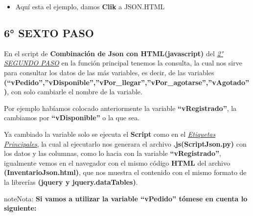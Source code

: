 \documentclass[letterpaper,11pt,spanish]{sphinxmanual}
\begin{document}
\begin{itemize}
\item {} 
Aquí esta el ejemplo, damos \textbf{Clik} a JSON.HTML

\end{itemize}


\subsection{6° SEXTO PASO}
\label{_templates/Contenido6/Parte3:json-html}\label{_templates/Contenido6/Parte3:sexto-paso}
En el script de \textbf{Combinación de Json con HTML(javascript)} del {\hyperref[_templates/Contenido6/Parte3:segundopaso]{\emph{2° SEGUNDO PASO}}} en la función principal tenemos la consulta, la cual nos sirve para consultar los datos de las más variables, es decir, de las variables \textbf{(``vPedido'',''vDisponible'',''vPor\_llegar'',''vPor\_agotarse'',''vAgotado'')}, con solo cambiarle el nombre de la variable.

Por ejemplo habíamos colocado anteriormente la variable \textbf{``vRegistrado''}, la cambiamos por \textbf{``vDisponible''} o la que sea.

Ya cambiado la variable solo se ejecuta el \textbf{Script} como en el {\hyperref[_templates/Contenido6/Parte4:tercerpaso]{\emph{Etiquetas Principales}}}, la cual al ejecutarlo nos generara el archivo \textbf{.js(ScriptJson.py)} con los datos y las columnas, como lo hacia con la variable \textbf{``vRegistrado''}, igualmente vemos en el navegador con el mismo código \textbf{HTML} del archivo \textbf{(InventarioJson.html)}, que nos muestra el contenido con el mismo formato de la librerías \textbf{(jquery y jquery.dataTables)}.




\begin{notice}{note}{Nota:}
\textbf{Si vamos a utilizar la variable ``vPedido'' tómese en cuenta lo siguiente:}
\end{notice}
\end{document}
